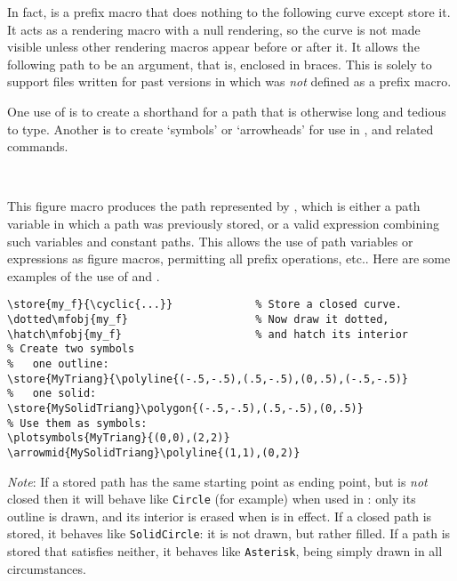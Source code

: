 \documentclass[letterpaper]{article}
\begin{document}
In fact,  is a prefix macro that does nothing to the following
curve except store it. It acts as a rendering macro with a null
rendering, so the curve is not made visible unless other rendering
macros appear before or after it. It allows the following path to be an
argument, that is, enclosed in braces. This is solely to support files
written for past \mfp{} versions in which  was \emph{not}
defined as a prefix macro.

One use of  is to create a shorthand for a path that is
otherwise long and tedious to type. Another is to create `symbols' or
`arrowheads' for use in ,  and related
commands.

\begin{cd}
\\
%
%
\end{cd}

This figure macro produces the path represented by , which is either a path variable in which a path was
previously stored, or a valid \MF{} expression combining such variables
and constant paths. This allows the use of path variables or
expressions as figure macros, permitting all prefix operations, etc..
Here are some examples of the use of  and .

\nobreak
\begin{verbatim}
\store{my_f}{\cyclic{...}}             % Store a closed curve.
\dotted\mfobj{my_f}                    % Now draw it dotted,
\hatch\mfobj{my_f}                     % and hatch its interior
% Create two symbols
%   one outline:
\store{MyTriang}{\polyline{(-.5,-.5),(.5,-.5),(0,.5),(-.5,-.5)}
%   one solid:
\store{MySolidTriang}\polygon{(-.5,-.5),(.5,-.5),(0,.5)}
% Use them as symbols:
\plotsymbols{MyTriang}{(0,0),(2,2)}
\arrowmid{MySolidTriang}\polyline{(1,1),(0,2)}
\end{verbatim}

\emph{Note}: If a stored path has the same starting point as ending
point, but is \emph{not} closed then it will behave like \texttt{Circle}
(for example) when used in : only its outline is drawn,
and its interior is erased when  is in effect. If a
closed path is stored, it behaves like \texttt{SolidCircle}: it is not
drawn, but rather filled. If a path is stored that satisfies neither, it
behaves like \texttt{Asterisk}, being simply drawn in all circumstances.
\end{document}
